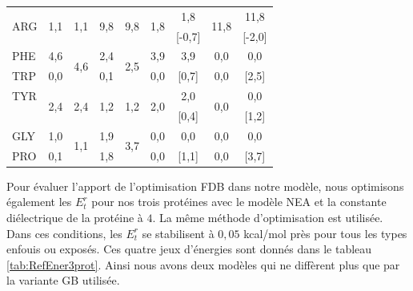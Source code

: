 \begin{table}[!htbp]
\begin{tabular}{l|cccc|cccc}
\hline
\multirow{2}{*}{ARG} & \multirow{2}{*}{1,1} & \multirow{2}{*}{1,1}   & \multirow{2}{*}{9,8}  & \multirow{2}{*}{9,8}   & \multirow{2}{*}{1,8} & 1,8                      & \multirow{2}{*}{11,8} & 11,8    \\
                     &                      &                        &                      &                         &                      & [-0,7]                    &                      & [-2,0]   \\
\hline
PHE                  & 4,6                  & \multirow{2}{*}{4,6}   & 2,4                  & \multirow{2}{*}{2,5}    &  3,9                 & 3,9                      & 0,0 & 0,0 \\
TRP                  & 0,0                  &                        & 0,1                  &                         &  0,0                 & [0,7]                    & 0,0 & [2,5]               \\
\hline
TYR                  & \multirow{2}{*}{2,4} & \multirow{2}{*}{2,4}  & \multirow{2}{*}{1,2}  &   \multirow{2}{*}{1,2}  &  \multirow{2}{*}{2,0} & 2,0                     & \multirow{2}{*}{0,0}  & 0,0   \\
                     &                      &                        &                      &                         &                       & [0,4]                   &                      & [1,2]  \\
\hline
GLY                  & 1,0                  & \multirow{2}{*}{1,1}   & 1,9                  & \multirow{2}{*}{3,7}    &   0,0                &  0,0                     & 0,0 & 0,0 \\
PRO                  & 0,1                  &                        & 1,8                  &                         &   0,0                &  [1,1]                   & 0,0 & [3,7]\\
\hline

\end{tabular}
\label{tab:FreqAA3}      
\end{table}


Pour évaluer l'apport de l'optimisation FDB dans notre modèle, nous optimisons également les $E_t^r$ pour nos trois protéines avec le modèle NEA et la constante diélectrique de la protéine à $4$. La même méthode d'optimisation est utilisée.  Dans ces conditions, les $E_t^r$ se stabilisent à $0,05$ kcal/mol près pour tous les types enfouis ou exposés. Ces quatre jeux d'énergies sont donnés dans le tableau \ref{tab:RefEner3prot}. Ainsi nous avons deux modèles qui ne diffèrent plus que par la variante GB utilisée.

